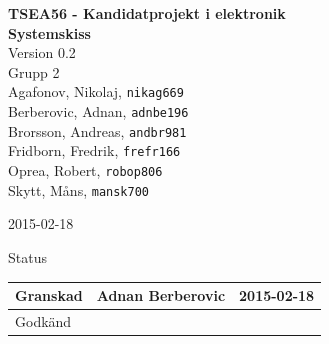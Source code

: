 \documentclass[11pt]{article}
\date{}
\begin{document}
\begin{titlepage}
\begin{center}
{\Large\bfseries TSEA56 - Kandidatprojekt i elektronik \\ Systemskiss}\\
%
\vspace{2\baselineskip}
%
Version 0.2\\
\vspace{2\baselineskip}
%
Grupp 2 \\
Agafonov, Nikolaj, 
\texttt{nikag669}
\\
Berberovic, Adnan, 
\texttt{adnbe196}
\\
Brorsson, Andreas, 
\texttt{andbr981}
\\
Fridborn, Fredrik, 
\texttt{frefr166}
\\
Oprea, Robert, 
\texttt{robop806}
\\
Skytt, Måns, 
\texttt{mansk700}

\vspace{2\baselineskip}
2015-02-18

\vspace{25\baselineskip}
Status
\begin{longtable}{|l|l|l|} \hline

Granskad &
Adnan Berberovic &
2015-02-18 \\ \hline
Godkänd &
 &
 \\ \hline
 
\end{longtable}

\end{center}
\end{titlepage}
\end{document}
